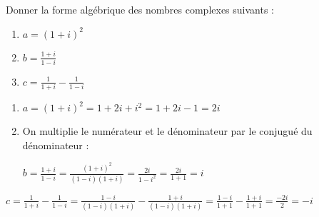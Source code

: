 
%
Donner la forme algébrique des nombres complexes suivants :
\begin{enumerate}
     \item
     $a=\left(1+i\right)^{2}$
     \item
     $b=\frac{1+i}{1-i}$
     \item
     $c=\frac{1}{1+i}-\frac{1}{1-i}$
\end{enumerate}
\begin{corrige}
     \begin{enumerate}
          \item
          $a=\left(1+i\right)^{2}=1+2i+i^{2}=1+2i-1=2i$
          \item
          On multiplie le numérateur et le dénominateur par le conjugué du dénominateur :
          \par
          $b=\frac{1+i}{1-i}=\frac{\left(1+i\right)^{2}}{\left(1-i\right)\left(1+i\right)}=\frac{2i}{1-i^{2}} $\nosp$=\frac{2i}{1+1}=i$
     \end{enumerate}
     $c=\frac{1}{1+i}-\frac{1}{1-i} $\nosp$=\frac{1-i}{\left(1-i\right)\left(1+i\right)}-\frac{1+i}{\left(1-i\right)\left(1+i\right)} $\nosp$  =\frac{1-i}{1+1}-\frac{1+i}{1+1} $\nosp$=\frac{-2i}{2}=-i$
\end{corrige}
